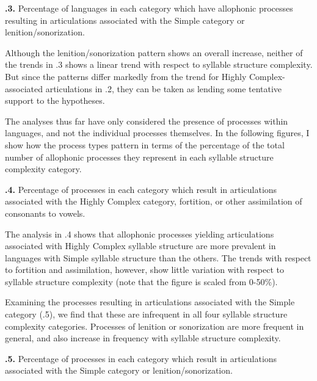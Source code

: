 \textbf{.3.} Percentage of languages in each category which have allophonic processes resulting in articulations associated with the Simple category or lenition/sonorization.



  Although the lenition/sonorization pattern shows an overall increase, neither of the trends in .3 shows a linear trend with respect to syllable structure complexity. But since the patterns differ markedly from the trend for Highly Complex-associated articulations in .2, they can be taken as lending some tentative support to the hypotheses.



  The analyses thus far have only considered the presence of processes within languages, and not the individual processes themselves. In the following figures, I show how the process types pattern in terms of the percentage of the total number of allophonic processes they represent in each syllable structure complexity category.





\textbf{.4.} Percentage of processes in each category which result in articulations associated with the Highly Complex category, fortition, or other assimilation of consonants to vowels.



  The analysis in .4 shows that allophonic processes yielding articulations associated with Highly Complex syllable structure are more prevalent in languages with Simple syllable structure than the others. The trends with respect to fortition and assimilation, however, show little variation with respect to syllable structure complexity (note that the figure is scaled from 0-50\%).



  Examining the processes resulting in articulations associated with the Simple category (.5), we find that these are infrequent in all four syllable structure complexity categories. Processes of lenition or sonorization are more frequent in general, and also increase in frequency with syllable structure complexity.





\textbf{.5.} Percentage of processes in each category which result in articulations associated with the Simple category or lenition/sonorization.



